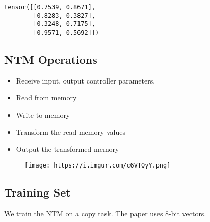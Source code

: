 \documentclass[11pt]{article}
\makeatletter
\def\maxwidth{\ifdim\Gin@nat@width>\linewidth\linewidth
    \else\Gin@nat@width\fi}
\let\Oldincludegraphics\includegraphics
\renewcommand{\includegraphics}[1]{\Oldincludegraphics[width=.8\maxwidth]{#1}}
\providecommand{\tightlist}{%
      \setlength{\itemsep}{0pt}\setlength{\parskip}{0pt}}
\makeatother
\begin{document}
    \begin{Verbatim}[commandchars=\\\{\}]
tensor([[0.7539, 0.8671],
        [0.8283, 0.3827],
        [0.3248, 0.7175],
        [0.9571, 0.5692]])

    \end{Verbatim}

    \subsection{NTM Operations}\label{ntm-operations}

\begin{itemize}
\tightlist
\item
  Receive input, output controller parameters.
\item
  Read from memory
\item
  Write to memory
\item
  Transform the read memory values
\item
  Output the transformed memory
\end{itemize}

    \begin{figure}
\centering
\texttt{[image: https://i.imgur.com/c6VTQyY.png]}
\caption{}
\end{figure}

    \subsection{Training Set}\label{training-set}

We train the NTM on a copy task. The paper uses 8-bit vectors.
\end{document}
